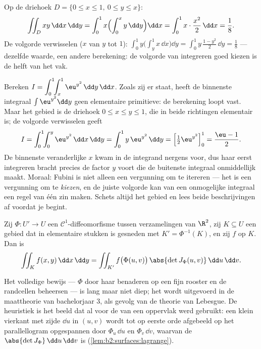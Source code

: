 \begin{example}\label{ex:b2:multint:triangle}
Op de driehoek $D = \{0 \leq x \leq 1,\ 0 \leq y \leq x\}$:
\[
\iint_D xy \,\dd x\,\dd y
= \int_0^1 x\Bigl(\int_0^x y\,\dd y\Bigr)\dd x
= \int_0^1 x\cdot\frac{x^2}{2}\,\dd x = \frac18 .
\]
De volgorde verwisselen ($x$ van $y$ tot $1$): $\int_0^1
y\bigl(\int_y^1 x\,\dd x\bigr)\dd y = \int_0^1 y\,\frac{1 -
y^2}{2}\,\dd y = \frac18$ --- dezelfde waarde, een andere
berekening: de volgorde van integreren goed kiezen is de helft van
het vak.
\end{example}

\begin{example}\label{ex:b2:multint:swaporder}
Bereken $I = \displaystyle\int_0^1\!\!\int_x^1
\eu^{y^2}\,\dd y\,\dd x$. Zoals zij er staat, heeft de binnenste
integraal $\int\eu^{y^2}\dd y$ geen elementaire primitieve: de
berekening loopt vast. Maar het gebied is de driehoek $0 \leq x
\leq y \leq 1$, die in beide richtingen elementair is; de volgorde
verwisselen geeft
\[
I = \int_0^1\!\!\int_0^y \eu^{y^2}\,\dd x\,\dd y
= \int_0^1 y\,\eu^{y^2}\,\dd y
= \Bigl[\tfrac12\eu^{y^2}\Bigr]_0^1 = \frac{\eu - 1}{2} .
\]
De binnenste veranderlijke $x$ kwam in de integrand nergens voor,
dus haar eerst integreren bracht precies de factor $y$ voort die de
buitenste integraal onmiddellijk maakt. Moraal: Fubini is niet
alleen een vergunning om te itereren --- het is een vergunning om
te \emph{kiezen}, en de juiste volgorde kan van een onmogelijke
integraal een regel van één zin maken. Schets altijd het gebied en
lees beide beschrijvingen af voordat je begint.
\end{example}

\begin{theorem}\label{thm:b2:multint:changevar}
Zij $\Phi \colon U' \to U$ een $\mathcal{C}^1$-diffeomorfisme
tussen  verzamelingen van $\R^2$, zij $K \subseteq U$ een
 gebied dat in elementaire stukken is gesneden met $K' =
\Phi^{-1}(K)$, en zij $f$  op $K$. Dan is
\[
\iint_K f(x, y)\,\dd x\,\dd y
= \iint_{K'} f\bigl(\Phi(u, v)\bigr)\,
\abs{\det J_\Phi(u, v)}\,\dd u\,\dd v .
\]
\end{theorem}
\admitted

\begin{remark}
Het volledige bewijs --- $\Phi$ door haar  benaderen
op een fijn rooster en de randcellen beheersen --- is lang maar
niet diep; het wordt  uitgevoerd in de maattheorie van
bachelorjaar 3, als gevolg van de theorie van Lebesgue. De
heuristiek is het beeld dat al voor de  van een oppervlak
werd gebruikt: een klein vierkant met zijde $\dd u$ in $(u, v)$
wordt tot op eerste orde afgebeeld op het parallellogram
opgespannen door $\Phi_u\,\dd u$ en $\Phi_v\,\dd v$, waarvan de
 $\abs{\det J_\Phi}\,\dd u\,\dd v$ is
(\cref{lem:b2:surfaces:lagrange}).
\end{remark}

